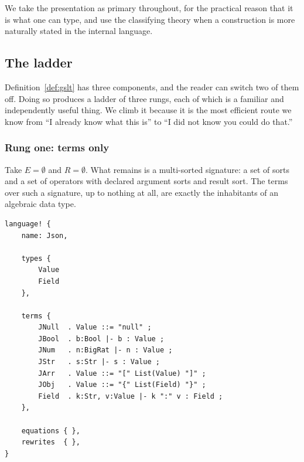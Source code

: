 \documentclass[11pt]{article}
\theoremstyle{definition}
\theoremstyle{plain}
\theoremstyle{remark}
\begin{document}
We take the presentation as primary throughout, for the practical reason that it is what
one can type, and use the classifying theory when a construction is more naturally stated
in the internal language.

\subsection{The ladder}
\label{subsec:ladder}

Definition~\ref{def:gslt} has three components, and the reader can switch two of them
off. Doing so produces a ladder of three rungs, each of which is a familiar and
independently useful thing. We climb it because it is the most efficient route we know
from ``I already know what this is'' to ``I did not know you could do that.''

\begin{center}
\end{center}

\subsubsection{Rung one: terms only}

Take $E = \emptyset$ and $R = \emptyset$. What remains is a multi-sorted signature: a
set of sorts and a set of operators with declared argument sorts and result sort. The
terms over such a signature, up to nothing at all, are exactly the inhabitants of an
algebraic data type.

\begin{lstlisting}
language! {
    name: Json,

    types {
        Value
        Field
    },

    terms {
        JNull  . Value ::= "null" ;
        JBool  . b:Bool |- b : Value ;
        JNum   . n:BigRat |- n : Value ;
        JStr   . s:Str |- s : Value ;
        JArr   . Value ::= "[" List(Value) "]" ;
        JObj   . Value ::= "{" List(Field) "}" ;
        Field  . k:Str, v:Value |- k ":" v : Field ;
    },

    equations { },
    rewrites  { },
}
\end{lstlisting}
\end{document}
